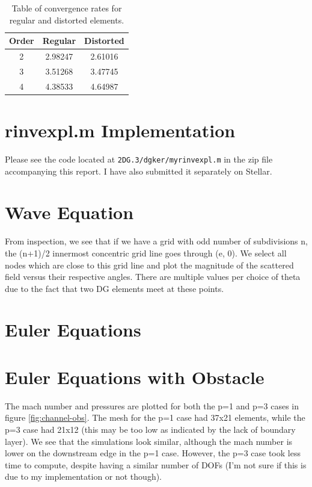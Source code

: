 \documentclass{article}
\begin{document}
\begin{table}[!ht]
\centering
\caption{Table of convergence rates for regular and distorted elements.}
\label{tbl:cc}
\begin{tabular}{c c c}
Order & Regular & Distorted \\
\midrule
2 & 2.98247 & 2.61016\\
3 & 3.51268 & 3.47745 \\
4 & 4.38533 & 4.64987 \\
\end{tabular}
\end{table}

\section{rinvexpl.m Implementation}
Please see the code located at \texttt{2DG.3/dgker/myrinvexpl.m} in the zip file accompanying this report.
I have also submitted it separately on Stellar.

\section{Wave Equation}
From inspection, we see that if we have a grid with odd number of subdivisions n, the (n+1)/2 innermost concentric grid line goes through (e, 0).
We select all nodes which are close to this grid line and plot the magnitude of the scattered field versus their respective angles.
There are multiple values per choice of theta due to the fact that two DG elements meet at these points.

\section{Euler Equations}

\section{Euler Equations with Obstacle}
The mach number and pressures are plotted for both the p=1 and p=3 cases in figure \ref{fig:channel-obs}.
The mesh for the p=1 case had 37x21 elements, while the p=3 case had 21x12 (this may be too low as indicated by the lack of boundary layer).
We see that the simulations look similar, although the mach number is lower on the downstream edge in the p=1 case.
However, the p=3 case took less time to compute, despite having a similar number of DOFs (I'm not sure if this is due to my implementation or not though).
\end{document}
